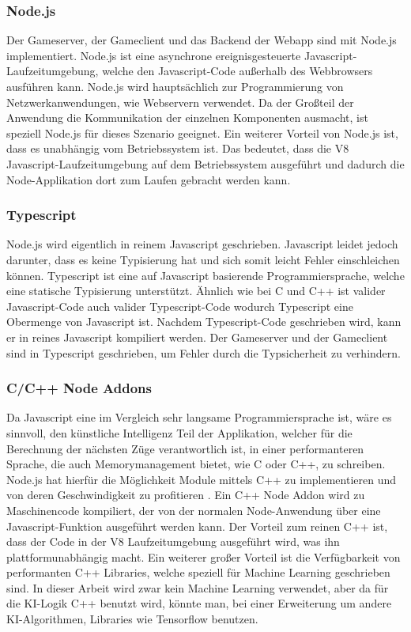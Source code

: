 \documentclass[12pt,a4paper,bibliography=totocnumbered,listof=totocnumbered]{article}
\begin{document}
\subsubsection{Node.js}
Der Gameserver, der Gameclient und das Backend der Webapp sind mit Node.js implementiert. 
Node.js ist eine asynchrone ereignisgesteuerte Javascript-Laufzeitumgebung, welche den Javascript-Code außerhalb des Webbrowsers ausführen kann.
Node.js wird hauptsächlich zur Programmierung von Netzwerkanwendungen, wie Webservern verwendet. Da der Großteil der Anwendung die
Kommunikation der einzelnen Komponenten ausmacht, ist speziell Node.js für dieses Szenario geeignet. 
Ein weiterer Vorteil von Node.js ist, dass es unabhängig vom Betriebssystem ist. Das bedeutet, dass die V8 Javascript-Laufzeitumgebung
auf dem Betriebssystem ausgeführt und dadurch die Node-Applikation dort zum Laufen gebracht werden kann.
\cite{Node}

\subsubsection{Typescript}
Node.js wird eigentlich in reinem Javascript geschrieben. Javascript leidet jedoch darunter, dass es keine Typisierung hat und sich somit leicht Fehler 
einschleichen können. Typescript ist eine auf Javascript basierende Programmiersprache, welche eine statische Typisierung unterstützt. 
Ähnlich wie bei C und C++ ist valider Javascript-Code auch valider Typescript-Code wodurch Typescript eine Obermenge von Javascript ist.
Nachdem Typescript-Code geschrieben wird, kann er in reines Javascript kompiliert werden.
Der Gameserver und der Gameclient sind in Typescript geschrieben, um Fehler durch die Typsicherheit zu verhindern. 

\subsubsection{C/C++ Node Addons}
Da Javascript eine im Vergleich sehr langsame Programmiersprache ist, wäre es sinnvoll, den künstliche Intelligenz Teil der Applikation, welcher für die 
Berechnung der nächsten Züge verantwortlich ist, in einer performanteren Sprache, die auch Memorymanagement bietet, wie C oder C++, zu schreiben. 
Node.js hat hierfür die Möglichkeit
Module mittels C++ zu implementieren und von deren Geschwindigkeit zu profitieren \cite{NodeC++Performance}. Ein C++ Node Addon wird zu Maschinencode kompiliert, der von der
normalen Node-Anwendung über eine Javascript-Funktion ausgeführt werden kann. Der Vorteil zum reinen C++ ist, dass der Code in der V8 
Laufzeitumgebung ausgeführt wird, was ihn plattformunabhängig macht. \cite{C++Node}
Ein weiterer großer Vorteil ist die Verfügbarkeit von performanten C++ Libraries, welche speziell für Machine Learning geschrieben sind. 
In dieser Arbeit wird zwar kein Machine Learning verwendet, aber da für die KI-Logik C++ benutzt wird, könnte man, bei einer Erweiterung 
um andere KI-Algorithmen, Libraries wie Tensorflow benutzen.
\end{document}
